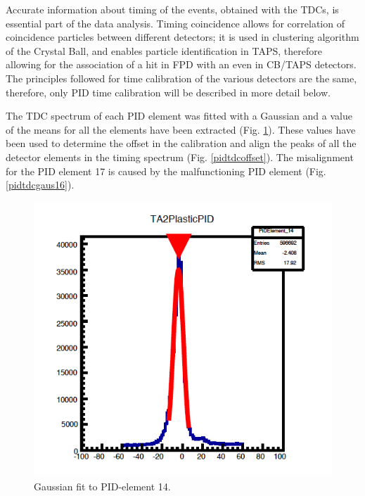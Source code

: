 \indent Accurate information about timing of the events, obtained with the TDCs, is essential part of the data analysis. Timing coincidence allows for correlation of coincidence particles between different detectors; it is used in clustering algorithm of the Crystal Ball, and enables particle identification in TAPS, therefore allowing for the association of a hit in FPD with an even in CB/TAPS detectors. The principles followed for time calibration of the various detectors are the same, therefore, only PID time calibration will be described in more detail below.

\indent The TDC spectrum of each PID element was fitted with a Gaussian and a value of the means for all the elements have been extracted (Fig. \ref{pidtdcgaus}). These values have been used to determine the offset in the calibration and align the peaks of all the detector elements in the timing spectrum (Fig. \ref{pidtdcoffset}). The misalignment for the PID element 17 is caused by the malfunctioning PID element (Fig. \ref{pidtdcgaus16}).

\begin{figure}[H]
\begin{center}
\includegraphics[scale=0.4]{pidtdcgaus.png}
\caption{Gaussian fit to PID-element 14.}
\label{pidtdcgaus}
\end{center}
\end{figure}

